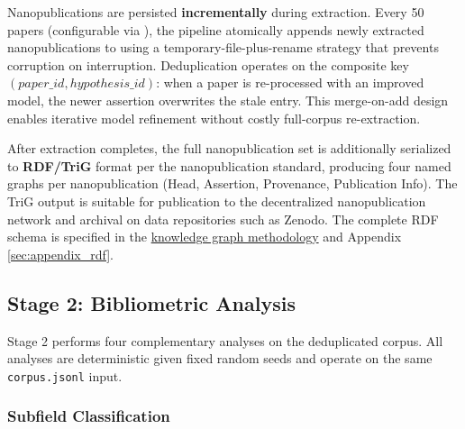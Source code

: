 \documentclass[
  english,
]{article}
\begin{document}
Nanopublications are persisted \textbf{incrementally} during extraction.
Every 50 papers (configurable via ), the
pipeline atomically appends newly extracted nanopublications to
 using a temporary-file-plus-rename
strategy that prevents corruption on interruption. Deduplication
operates on the composite key \((paper\_id, hypothesis\_id)\): when a
paper is re-processed with an improved model, the newer assertion
overwrites the stale entry. This merge-on-add design enables iterative
model refinement without costly full-corpus re-extraction.

After extraction completes, the full nanopublication set is additionally
serialized to \textbf{RDF/TriG} format per the nanopublication standard,
producing four named graphs per nanopublication (Head, Assertion,
Provenance, Publication Info). The TriG output is suitable for
publication to the decentralized nanopublication network and archival on
data repositories such as Zenodo. The complete RDF schema is specified
in the \hyperref[sec:methods_kg]{knowledge graph methodology} and
Appendix \ref{sec:appendix_rdf}.

\newpage

\subsection{Stage 2: Bibliometric
Analysis}\label{sec:methods_bibliometrics}

Stage 2 performs four complementary analyses on the deduplicated corpus.
All analyses are deterministic given fixed random seeds and operate on
the same \texttt{corpus.jsonl} input.

\subsubsection{Subfield Classification}\label{subfield-classification}
\end{document}
